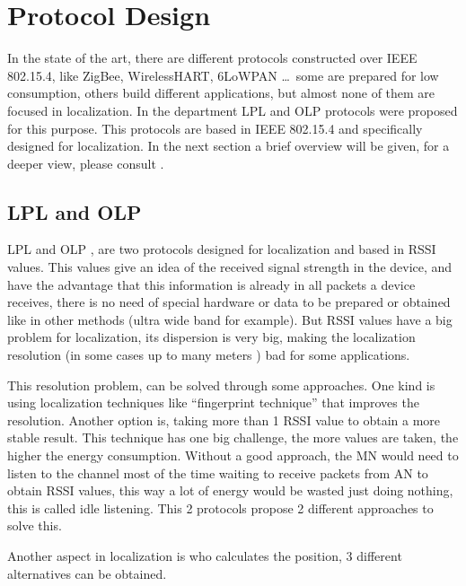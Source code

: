 \chapter{Protocol Design}
\label{chap:protocoldesign}

In the state of the art, there are different protocols constructed over \ac{IEEE} 802.15.4, like ZigBee, WirelessHART, 6LoWPAN \ldots \ some
are prepared for low consumption, others build different applications, but almost none of them are focused in localization. In the
department \ac{LPL} and \ac{OLP} \cite{LPLandOLP} protocols were proposed for this purpose. This protocols are based in \ac{IEEE} 802.15.4 and specifically 
designed for localization. In the next section a brief overview will be given, for a deeper view, please consult \cite{LPLandOLP}.

\section{\ac{LPL} and \ac{OLP}}

\ac{LPL} and \ac{OLP} \cite{LPLandOLP}, are two protocols designed for localization and based in \ac{RSSI} values. This values give an idea of 
the received signal strength in the device, and have the advantage that this information is already in all packets a device receives, there
is no need of special hardware or data to be prepared or obtained like in other methods (ultra wide band for example). But \ac{RSSI} values have 
a big problem for localization, its dispersion is very big, making the localization resolution (in some cases up to many meters 
\cite{fingerprint}) bad for some applications. 

This resolution problem, can be solved through some approaches. One kind is using localization techniques like ``fingerprint 
technique'' \cite{fingerprint} that improves the resolution. Another option is, taking more than 1 \ac{RSSI} value to obtain a more stable 
result. This technique has one big challenge, the more values are taken, the higher the energy consumption. Without a good approach, 
the \ac{MN} would need to listen to the channel most of the time waiting to receive packets from \ac{AN} to obtain \ac{RSSI} values, 
this way a lot of energy would be wasted just doing nothing, this is called idle listening. This 2 protocols propose 2 different 
approaches to solve this.

Another aspect in localization is who calculates the position, 3 different alternatives can be obtained.

